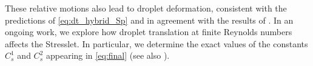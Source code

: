 These relative motions also lead to droplet deformation, consistent with the predictions of \eqref{eq:dt_hybrid_Sp} and in agreement with the results of \citet{taylor1964deformation}.
In an ongoing work, we explore how droplet translation at finite Reynolds numbers affects the Stresslet. 
In particular, we determine the exact values of the constants $C_s^{1}$ and $C_s^{2}$ appearing in \ref{eq:final} (see also \citet{fintzi2025}).
 


